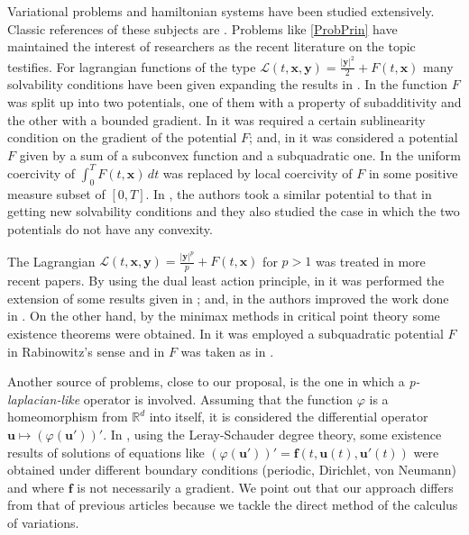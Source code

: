 \documentclass[twoside]{article}
\theoremstyle{remark}
\renewcommand{\b}[1]{\boldsymbol{#1}}
\newcommand{\rr}{\mathbb{R}}
\begin{document}
Variational problems and hamiltonian systems  have been studied extensively. Classic references of these subjects are
\cite{mawhin2010critical,struwe2008variational,ekeland1999convex}. Problems like \eqref{ProbPrin} have maintained the interest of researchers as the recent literature on the topic testifies. For lagrangian functions of the type $\mathcal{L}(t,\b{x},\b{y})=\frac{|\b{y}|^2}{2}+F(t,\b{x})$  many solvability conditions have been given expanding the results in \cite{mawhin2010critical}.  
In  \cite{tang1995periodic} the function $F$
was split up into two potentials, one of them with a property of subadditivity and the other with a bounded
gradient.
In \cite{tang1998periodic} it was required a certain sublinearity condition on the gradient of the potential $F$; and, 
in \cite{wu1999periodic} it was considered a potential $F$ given by a sum of a subconvex function and a  subquadratic one. 
In  \cite{tang2001periodic} the uniform coercivity of $\int_0^T F(t,\b{x})\,dt$
was replaced by local coercivity of $F$ in some positive measure subset of $[0,T]$.
In \cite{zhao2004periodic}, the authors took a similar potential to that in \cite{wu1999periodic} getting new solvability conditions 
and they also studied the case in which the two potentials do not have any convexity.
%

The Lagrangian  $\mathcal{L}(t,\b{x},\b{y})=\frac{|\b{y}|^p}{p}+F(t,\b{x})$
for $p>1$ was treated in more recent papers.
By using the dual least action principle, in \cite{Tian2007192}
it was performed the extension of some results given in \cite{mawhin2010critical};
and, in \cite{tang2010periodic} the authors improved the work done in \cite{wu1999periodic}.
On the other hand, by the minimax methods in critical point theory 
some existence theorems were obtained.
In \cite{xu2007some} it was employed a subquadratic potential $F$ 
in Rabinowitz{}'s sense 
and in \cite{ye2008periodic} $F$ was taken as in \cite{tang1998periodic}.

Another source of problems, close to our proposal, is the one in which a \emph {p-laplacian-like} operator is involved.
Assuming that the function $\varphi$ is a homeomorphism  from $\rr^d$ into itself, it is considered the differential operator
$\b u \mapsto (\varphi(\b u'))'$. 
In  \cite{C-2007,C-2009, 
Cristia-2008, manasevich2000boundary, manasevich1998periodic}, using 
the Leray-Schauder degree theory,
some existence results of solutions of equations 
like 
$(\varphi({\b u}'))'={\b f}(t,{\b u}(t),{\b u}'(t))$ were obtained 
under different boundary conditions (periodic, Dirichlet, von Neumann) 
and where $\b f$ is not necessarily a gradient. 
We point out that our approach 
differs from that of previous articles because
we tackle the direct method of the calculus of variations.
\end{document}
